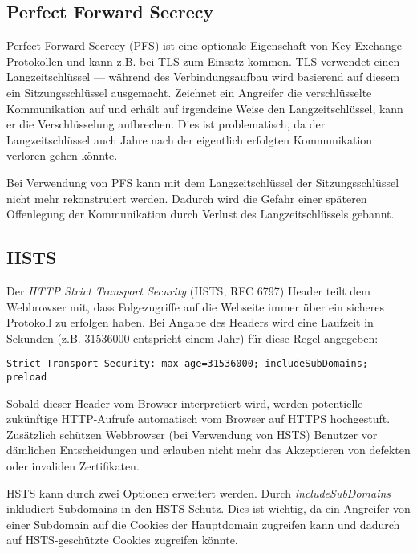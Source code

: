 \subsection{Perfect Forward Secrecy}

Perfect Forward Secrecy (PFS) ist eine optionale Eigenschaft von Key-Exchange Protokollen und kann z.B. bei TLS zum Einsatz kommen. TLS verwendet einen Langzeitschlüssel --- während des Verbindungsaufbau wird basierend auf diesem ein Sitzungsschlüssel ausgemacht. Zeichnet ein Angreifer die verschlüsselte Kommunikation auf und erhält auf irgendeine Weise den Langzeitschlüssel, kann er die Verschlüsselung aufbrechen. Dies ist problematisch, da der Langzeitschlüssel auch Jahre nach der eigentlich erfolgten Kommunikation verloren gehen könnte.

Bei Verwendung von PFS kann mit dem Langzeitschlüssel der Sitzungsschlüssel nicht mehr rekonstruiert werden. Dadurch wird die Gefahr einer späteren Offenlegung der Kommunikation durch Verlust des Langzeitschlüssels gebannt.

\subsection{HSTS}
\label{hsts}

Der \textit{HTTP Strict Transport Security} (HSTS, RFC 6797) Header teilt dem Webbrowser mit, dass Folgezugriffe auf die Webseite immer über ein sicheres Protokoll zu erfolgen haben. Bei Angabe des Headers wird eine Laufzeit in Sekunden (z.B. 31536000 entspricht einem Jahr) für diese Regel angegeben:

\begin{verbatim}
Strict-Transport-Security: max-age=31536000; includeSubDomains; preload
\end{verbatim}

Sobald dieser Header vom Browser interpretiert wird, werden potentielle zukünftige HTTP-Aufrufe automatisch vom Browser auf HTTPS hochgestuft. Zusätzlich schützen Webbrowser (bei Verwendung von HSTS) Benutzer vor dämlichen Entscheidungen und erlauben nicht mehr das Akzeptieren von defekten oder invaliden Zertifikaten.

HSTS kann durch zwei Optionen erweitert werden. Durch \textit{includeSubDomains} inkludiert Subdomains in den HSTS Schutz. Dies ist wichtig, da ein Angreifer von einer Subdomain auf die Cookies der Hauptdomain zugreifen kann und dadurch auf HSTS-geschützte Cookies zugreifen könnte.

